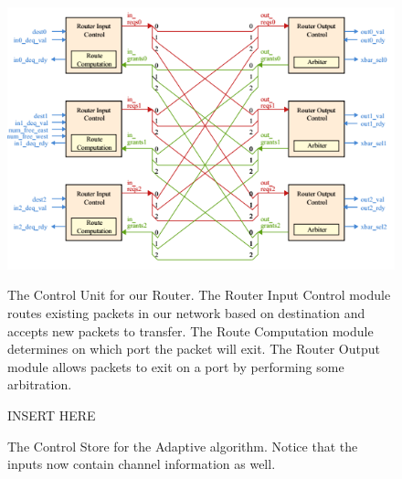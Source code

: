 \documentclass[10pt]{article}
\begin{document}
\begin{figure}[h]
	\centering
	\includegraphics[scale=0.7]{baselinectrl}
	\label{fig:ctrl}
	\caption
	{
		The Control Unit for our Router.
		The Router Input Control module routes existing packets in our network 
		based on destination and accepts new packets to transfer.
		The Route Computation module determines on which port the packet will
		exit.
		The Router Output module allows packets to exit on a port by performing
		some arbitration. 
	}
\end{figure}

\begin{figure}[h]
	\centering
	INSERT HERE
	\caption{The Control Store for the Adaptive algorithm. 
			 Notice that the inputs now contain channel information as well.}
	\label{fig:altctrl}
\end{figure}
\end{document}
